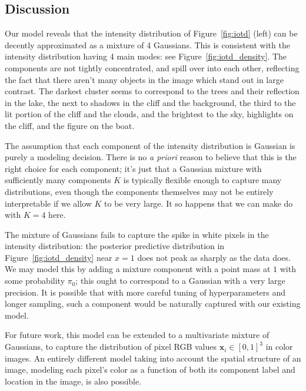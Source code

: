 \documentclass[12pt]{article}
\begin{document}
\subsection*{Discussion}

Our model reveals that the intensity distribution of Figure~\ref{fig:iotd}
(left) can be decently approximated as a mixture of 4 Gaussians.
This is consistent with the intensity distribution having 4 main modes: see
Figure~\ref{fig:iotd_density}.
The components are not tightly concentrated, and spill over into each other,
reflecting the fact that there aren't many objects in the image which stand out
in large contrast.
The darkest cluster seems to correspond to the trees and their reflection in
the lake, the next to shadows in the cliff and the background, the third to the
lit portion of the cliff and the clouds, and the brightest to the sky,
highlights on the cliff, and the figure on the boat.

The assumption that each component of the intensity distribution is Gaussian is
purely a modeling decision.
There is no \emph{a priori} reason to believe that this is the right choice for
each component; it's just that a Gaussian mixture with sufficiently many
components $K$ is typically flexible enough to capture many distributions, even
though the components themselves may not be entirely interpretable if we allow
$K$ to be very large.
It so happens that we can make do with $K = 4$ here.

The mixture of Gaussians fails to capture the spike in white pixels in the
intensity distribution: the posterior predictive distribution in
Figure~\ref{fig:iotd_density} near $x = 1$ does not peak as sharply as the data
does.
We may model this by adding a mixture component with a point mass at $1$ with
some probability $\pi_0$; this ought to correspond to a Gaussian with a very
large precision.
It is possible that with more careful tuning of hyperparameters and longer
sampling, such a component would be naturally captured with our existing model.

For future work, this model can be extended to a multivariate mixture of
Gaussians, to capture the distribution of pixel RGB values $\bm{x}_i \in [0,
1]^3$ in color images.
An entirely different model taking into account the spatial structure of an
image, modeling each pixel's color as a function of both its component label
and location in the image, is also possible.
\end{document}

